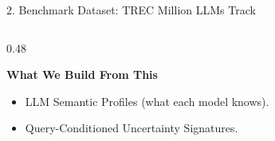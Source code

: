 \documentclass[aspectratio=169, 10pt]{beamer}
\begin{document}
\begin{frame}{2. Benchmark Dataset: TREC Million LLMs Track}
\begin{columns}[T]
\begin{column}{0.48\textwidth}
            \vspace{0.2cm}
            \begin{exampleblock}{\textbf{What We Build From This}}
                \begin{itemize}
                    \item LLM Semantic Profiles (what each model knows).
                    \item Query-Conditioned Uncertainty Signatures.
                \end{itemize}
            \end{exampleblock}
        \end{column}
    \end{columns}
\end{frame}

\end{document}
